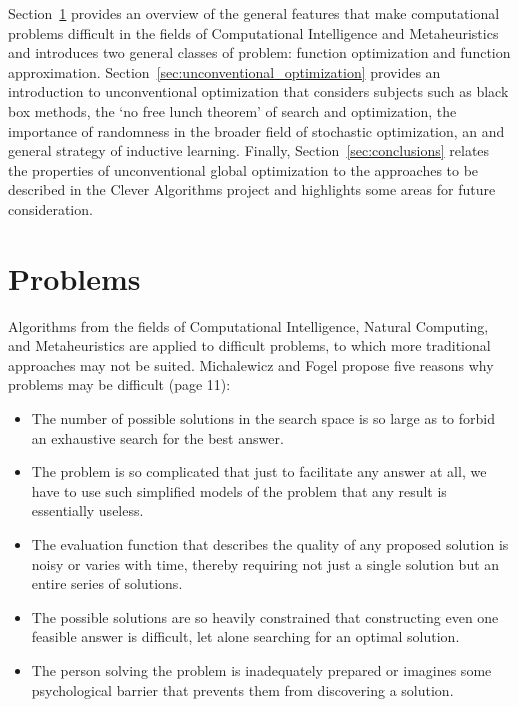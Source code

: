 \documentclass[a4paper, 11pt]{article}
\begin{document}
Section~\ref{sec:problems} provides an overview of the general features that make computational problems difficult in the fields of Computational Intelligence and Metaheuristics and introduces two general classes of problem: function optimization and function approximation.
Section~\ref{sec:unconventional_optimization} provides an introduction to unconventional optimization that considers subjects such as black box methods, the `no free lunch theorem' of search and optimization, the importance of randomness in the broader field of stochastic optimization, an and general strategy of inductive learning. 
Finally, Section~\ref{sec:conclusions} relates the properties of unconventional global optimization to the approaches to be described in the Clever Algorithms project and highlights some areas for future consideration.

% 
% 
\section{Problems}
\label{sec:problems}
Algorithms from the fields of Computational Intelligence, Natural Computing, and Metaheuristics are applied to difficult problems, to which more traditional approaches may not be suited.
Michalewicz and Fogel propose five reasons why problems may be difficult \cite{Michalewicz2004} (page 11):
\begin{itemize}
	\item The number of possible solutions in the search space is so large as to forbid an exhaustive search for the best answer.
	\item The problem is so complicated that just to facilitate any answer at all, we have to use such simplified models of the problem that any result is essentially useless.
	\item The evaluation function that describes the quality of any proposed solution is noisy or varies with time, thereby requiring not just a single solution but an entire series of solutions.
	\item The possible solutions are so heavily constrained that constructing even one feasible answer is difficult, let alone searching for an optimal solution.
	\item The person solving the problem is inadequately prepared or imagines some psychological barrier that prevents them from discovering a solution.
\end{itemize}
\end{document}
